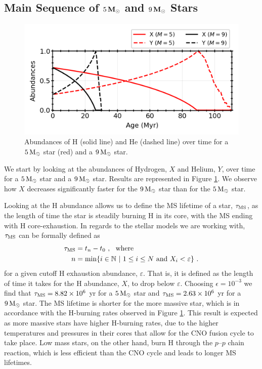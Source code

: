 \subsection{Main Sequence of $5 \, {\rm \textbf{M}}_\odot$ and $9 \,{\rm \textbf{M}}_\odot$ Stars}

\begin{figure}[!ht]
    \centering
    \includegraphics[width=1.0\columnwidth]{../figures/abundances.png}  %
    \caption{\small Abundances of H (solid line) and He (dashed line) over time for a $5 \, {\rm M}_\odot$ star (red) and a $9\, {\rm M}_\odot$ star.}
    \label{fig:abundances}
\end{figure}

We start by looking at the abundances of Hydrogen, $X$ and Helium, $Y$, over time for a $5 \, {\rm M}_\odot$ star and a $9 \, {\rm M}_\odot$ star. Results are represented in Figure \ref{fig:abundances}. We observe how $X$ decreases significantly faster for the $ 9 \,{\rm M}_\odot$ star than for the $5 \,{\rm M}_\odot$ star.

Looking at the H abundance allows us to define the MS lifetime of a star, $\tau_{\rm MS}$, as the length of time the star is steadily burning H in its core, with the MS ending with H core-exhaustion. In regards to the stellar models we are working with, $\tau_{\rm MS}$ can be formally defined as
\begin{align}
    \tau_{\rm MS} & = t_n - t_0 \ , \ \ {\rm where}                                                              \notag              \\
    n             & = {\rm min}\{i\in \mathbb{N} \ | \  1 \leq i \leq N \ {\rm and} \ X_i < \varepsilon\} \ . \label{eq:MS_lifetime}
\end{align}
for a given cutoff H exhaustion abundance, $\varepsilon$. That is, it is defined as the length of time it takes for the H abundance,
$X$, to drop below $\varepsilon$. Choosing $\epsilon = 10^{-3}$ we find that $\tau_{\rm MS} = 8.82 \times 10^6$ yr for a $5 \, {\rm M}_\odot$ star and $\tau_{\rm MS} = 2.63 \times 10^6$ yr for a $9 \, {\rm M}_\odot$ star. The MS lifetime is shorter for the more massive star, which is in accordance with the H-burning rates observed in Figure \ref{fig:abundances}. This result is expected as more massive stars have higher H-burning rates, due to the higher temperatures and pressures in their cores that allow for the CNO fusion cycle to take place. Low mass stars, on the other hand, burn H through the $p\text{--}p$ chain reaction, which is less efficient than the CNO cycle and leads to longer MS lifetimes.

